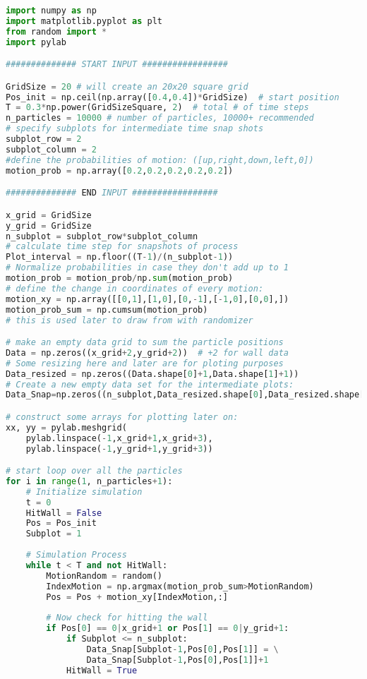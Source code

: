 \begin{lstlisting}[language = python, caption = 2D Ramdom Walk Simulation]
import numpy as np
import matplotlib.pyplot as plt
from random import *
import pylab

############## START INPUT #################

GridSize = 20 # will create an 20x20 square grid
Pos_init = np.ceil(np.array([0.4,0.4])*GridSize)  # start position
T = 0.3*np.power(GridSizeSquare, 2)  # total # of time steps
n_particles = 10000 # number of particles, 10000+ recommended
# specify subplots for intermediate time snap shots
subplot_row = 2             
subplot_column = 2
#define the probabilities of motion: ([up,right,down,left,0]) 
motion_prob = np.array([0.2,0.2,0.2,0.2,0.2])

############## END INPUT #################

x_grid = GridSize
y_grid = GridSize
n_subplot = subplot_row*subplot_column
# calculate time step for snapshots of process
Plot_interval = np.floor((T-1)/(n_subplot-1))
# Normalize probabilities in case they don't add up to 1
motion_prob = motion_prob/np.sum(motion_prob)
# define the change in coordinates of every motion:
motion_xy = np.array([[0,1],[1,0],[0,-1],[-1,0],[0,0],])
motion_prob_sum = np.cumsum(motion_prob)
# this is used later to draw from with randomizer

# make an empty data grid to sum the particle positions
Data = np.zeros((x_grid+2,y_grid+2))  # +2 for wall data
# Some resizing here and later are for ploting purposes
Data_resized = np.zeros((Data.shape[0]+1,Data.shape[1]+1))
# Create a new empty data set for the intermediate plots:
Data_Snap=np.zeros((n_subplot,Data_resized.shape[0],Data_resized.shape[1]))

# construct some arrays for plotting later on:
xx, yy = pylab.meshgrid(
    pylab.linspace(-1,x_grid+1,x_grid+3),
    pylab.linspace(-1,y_grid+1,y_grid+3))

# start loop over all the particles
for i in range(1, n_particles+1):
    # Initialize simulation
    t = 0
    HitWall = False
    Pos = Pos_init
    Subplot = 1
    
    # Simulation Process
    while t < T and not HitWall:
        MotionRandom = random()
        IndexMotion = np.argmax(motion_prob_sum>MotionRandom)
        Pos = Pos + motion_xy[IndexMotion,:] 
        
        # Now check for hitting the wall
        if Pos[0] == 0|x_grid+1 or Pos[1] == 0|y_grid+1:
            if Subplot <= n_subplot:             
                Data_Snap[Subplot-1,Pos[0],Pos[1]] = \
                Data_Snap[Subplot-1,Pos[0],Pos[1]]+1
            HitWall = True


\end{lstlisting}
